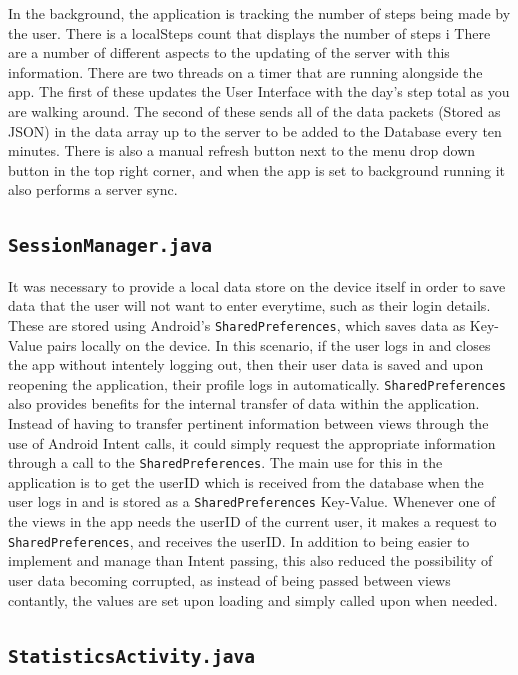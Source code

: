 \documentclass{l4proj}
\begin{document}
In the background, the application is tracking the number of steps being made by the user. There is a localSteps count that displays the number of steps i There are a number of different aspects to the updating of the server with this information. There are two threads on a timer that are running alongside the app. The first of these updates the User Interface with the day's step total as you are walking around. The second of these sends all of the data packets (Stored as JSON) in the data array up to the server to be added to the Database every ten minutes. There is also a manual refresh button next to the menu drop down button in the top right corner, and when the app is set to background running it also performs a server sync.

\subsection{\texttt{SessionManager.java}}

It was necessary to provide a local data store on the device itself in order to save data that the user will not want to enter everytime, such as their login details. These are stored using Android's \texttt{SharedPreferences}, which saves data as Key-Value pairs locally on the device. In this scenario, if the user logs in and closes the app without intentely logging out, then their user data is saved and upon reopening the application, their profile logs in automatically. \texttt{SharedPreferences} also provides benefits for the internal transfer of data within the application. Instead of having to transfer pertinent information between views through the use of Android Intent calls, it could simply request the appropriate information through a call to the \texttt{SharedPreferences}. The main use for this in the application is to get the userID which is received from the database when the user logs in and is stored as a \texttt{SharedPreferences} Key-Value. Whenever one of the views in the app needs the userID of the current user, it makes a request to \texttt{SharedPreferences}, and receives the userID. In addition to being easier to implement and manage than Intent passing, this also reduced the possibility of user data becoming corrupted, as instead of being passed between views contantly, the values are set upon loading and simply called upon when needed.

\subsection{\texttt{StatisticsActivity.java}}
\end{document}
